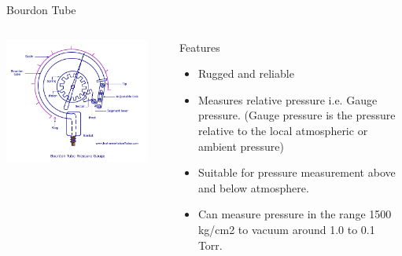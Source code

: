 \documentclass[11pt]{beamer}
\begin{document}
\begin{frame}{Bourdon Tube}

\begin{columns}[t]
    
      
       \begin{exampleblock}{}
          \begin{center}
			\includegraphics[width=0.9\textwidth]{Bourdon-Tube-Pressure-Gauge.jpg}
		\end{center}
       \end{exampleblock}
       
       \begin{exampleblock}{ Features }
          
           \begin{itemize}
           		\item  Rugged and reliable
           		\item Measures relative pressure i.e. Gauge pressure.
    					(Gauge pressure is the pressure relative to the local atmospheric or ambient pressure)
    			\item Suitable for pressure measurement above and below atmosphere.
  		 \item  Can measure pressure in the range 1500 kg/cm2  to vacuum around 1.0 to 0.1 Torr.
           \end{itemize}
   
         
       
       \end{exampleblock}   
   
    \end{columns}   

\end{frame}
\end{document}
